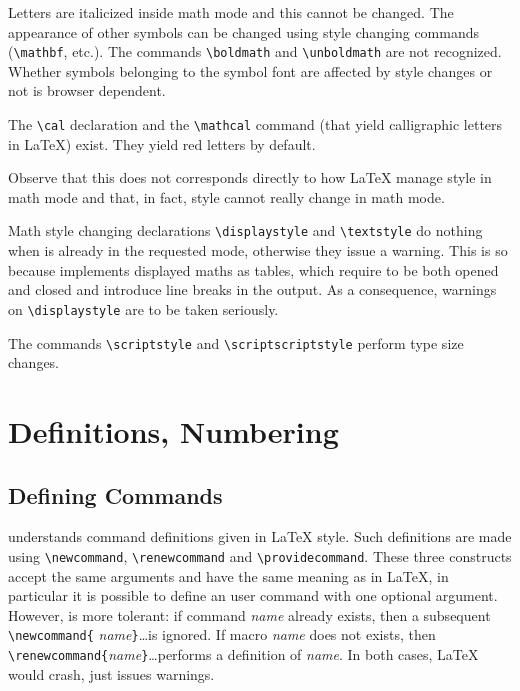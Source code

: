 Letters are italicized inside math mode and this cannot be
changed. The appearance of
other symbols can be changed using
\LaTeXe{} style changing commands (\verb+\mathbf+, etc.).
The commands \verb+\boldmath+ and \verb+\unboldmath+ are not
recognized. Whether symbols belonging to the symbol font are affected
by style changes or not is browser dependent.

The \verb+\cal+ declaration and the \verb+\mathcal+ command (that
yield calligraphic letters in \LaTeX) exist. They yield red letters by
default.

Observe that this does not corresponds directly to how \LaTeX{} manage style
in math mode and that, in fact, style cannot really change in math mode.

Math style changing declarations \verb+\displaystyle+ and
\verb+\textstyle+ do nothing when \hevea{} is already in the requested
mode,
otherwise they issue a warning.
This is so because \hevea{} implements displayed maths as tables,
which require to be both opened and closed and introduce line breaks
in the output.
As a consequence, warnings on \verb+\displaystyle+ are to be taken seriously.


The commands \verb+\scriptstyle+ and \verb+\scriptscriptstyle+
perform type size changes.

\section{Definitions, Numbering}

\subsection{Defining Commands}\label{usermacro}

\hevea{} understands command definitions given in \LaTeX{} style. Such
definitions are made using
\verb+\newcommand+, \verb+\renewcommand+ and \verb+\providecommand+.
These three constructs accept the same arguments and have the same
meaning as in \LaTeX{}, in particular it is possible to define an user
command with one optional argument.
However, \hevea{} is more tolerant: if command
{\it name} already exists, then a subsequent \verb+\newcommand{+{\it
name}\verb+}+\ldots is ignored.  If macro {\it name} does not exists, then
\verb+\renewcommand{+{\it name}\verb+}+\ldots performs{} a definition of {\it
name}.  In both cases, \LaTeX{} would crash, \hevea{} just issues
warnings.

